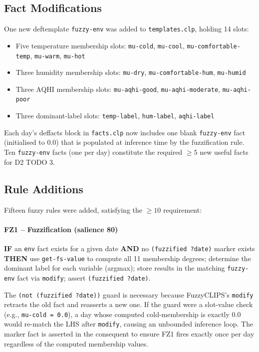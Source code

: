 \documentclass{article}
\begin{document}
\subsection{Fact Modifications}

One new deftemplate \texttt{fuzzy-env} was added to \texttt{templates.clp}, holding 14 slots:

\begin{itemize}
    \item Five temperature membership slots: \texttt{mu-cold}, \texttt{mu-cool}, \texttt{mu-comfortable-temp}, \texttt{mu-warm}, \texttt{mu-hot}
    \item Three humidity membership slots: \texttt{mu-dry}, \texttt{mu-comfortable-hum}, \texttt{mu-humid}
    \item Three AQHI membership slots: \texttt{mu-aqhi-good}, \texttt{mu-aqhi-moderate}, \texttt{mu-aqhi-poor}
    \item Three dominant-label slots: \texttt{temp-label}, \texttt{hum-label}, \texttt{aqhi-label}
\end{itemize}

Each day's deffacts block in \texttt{facts.clp} now includes one blank \texttt{fuzzy-env} fact (initialised to 0.0) that is populated at inference time by the fuzzification rule. Ten \texttt{fuzzy-env} facts (one per day) constitute the required $\geq 5$ new useful facts for D2 TODO 3.

\subsection{Rule Additions}

Fifteen fuzzy rules were added, satisfying the $\geq 10$ requirement:

\paragraph{FZ1 -- Fuzzification (salience 80)}
\textbf{IF} an \texttt{env} fact exists for a given date \textbf{AND} no \texttt{(fuzzified ?date)} marker exists \\
\textbf{THEN} use \texttt{get-fs-value} to compute all 11 membership degrees; determine the dominant label for each variable (argmax); store results in the matching \texttt{fuzzy-env} fact via \texttt{modify}; assert \texttt{(fuzzified ?date)}.

The \texttt{(not (fuzzified ?date))} guard is necessary because FuzzyCLIPS's \texttt{modify} retracts the old fact and reasserts a new one.
If the guard were a slot-value check (e.g., \texttt{mu-cold = 0.0}), a day whose computed cold-membership is exactly 0.0 would re-match the LHS after \texttt{modify}, causing an unbounded inference loop.
The marker fact is asserted in the consequent to ensure FZ1 fires exactly once per day regardless of the computed membership values.
\end{document}
